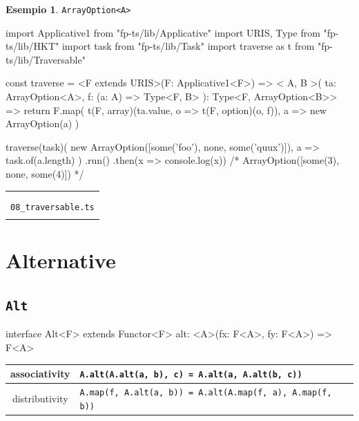 \documentclass[12pt]{article}
\theoremstyle{definition}
\newtheorem{example}{Esempio}[section]
\newenvironment{demo}
    {\begin{center}
    \begin{tabular}{|p{0.9\textwidth}|}
    \hline\\
    }
    {
    \\\\\hline
    \end{tabular}
    \end{center}
    }
\newenvironment{code}
  {\vspace{0.5cm} \VerbatimEnvironment\begin{typescriptcode}}
  {\end{typescriptcode} \vspace{0.2cm}}
\begin{document}
\begin{example}
\texttt{ArrayOption<A>}

\begin{code}
import { Applicative1 } from "fp-ts/lib/Applicative"
import { URIS, Type } from "fp-ts/lib/HKT"
import { task } from "fp-ts/lib/Task"
import { traverse as t } from "fp-ts/lib/Traversable"

const traverse = <F extends URIS>(F: Applicative1<F>) => <
  A,
  B
>(
  ta: ArrayOption<A>,
  f: (a: A) => Type<F, B>
): Type<F, ArrayOption<B>> => {
  return F.map(
    t(F, array)(ta.value, o => t(F, option)(o, f)),
    a => new ArrayOption(a)
  )
}

traverse(task)(
  new ArrayOption([some('foo'), none, some('quux')]),
  a => task.of(a.length)
)
  .run()
  .then(x => console.log(x))
/*
ArrayOption([some(3), none, some(4)])
*/
\end{code}
\end{example}

\begin{demo}
\begin{center}
\textbf{DEMO}

\texttt{06\_BinaryTree.ts} \\
\texttt{08\_traversable.ts}
\end{center}
\end{demo}

\newpage

\section{Alternative}

\subsection{\texttt{Alt}}

\begin{code}
interface Alt<F> extends Functor<F> {
  alt: <A>(fx: F<A>, fy: F<A>) => F<A>
}
\end{code}

\begin{center}
\bgroup
\def\arraystretch{1.5}
\begin{tabular}{ |c|p{10cm}| }
\hline
associativity & \texttt{A.alt(A.alt(a, b), c) = A.alt(a, A.alt(b, c))} \\
\hline
distributivity & \texttt{A.map(f, A.alt(a, b)) = A.alt(A.map(f, a), A.map(f, b))} \\
\hline
\end{tabular}
\egroup
\end{center}
\end{document}

